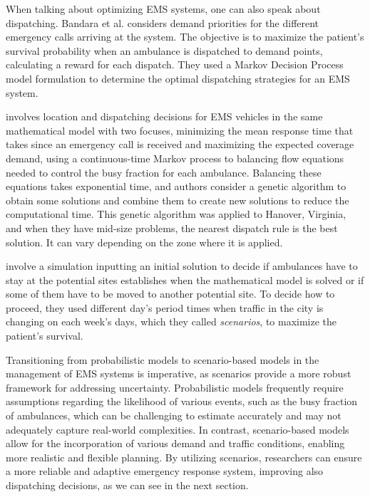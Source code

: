 When talking about optimizing EMS systems, one can also speak about dis\-pat\-ching. Bandara et al. \cite{bandara2012optimal} considers demand priorities for the different emergency calls arriving at the system. The objective is to maximize the patient's survival probability when an ambulance is dispatched to demand points, calculating a reward for each dispatch. They used a Markov Decision Process model formulation to determine the optimal dispatching strategies for an EMS system.

\citet{toro2013joint} involves location and dispatching decisions for EMS ve\-hi\-cles in the same mathematical model with two focuses, minimizing the mean response time that takes since an emergency call is received and maximizing the expected coverage demand, using a continuous-time Markov process to balancing flow e\-qua\-tions needed to control the busy fraction for each ambulance. Balancing these equations takes exponential time, and authors consider a genetic algorithm to obtain some solutions and combine them to create new solutions to reduce the computational time. This genetic algorithm was applied to Hanover, Virginia, and when they have mid-size problems, the nearest dispatch rule is the best solution. It can vary depending on the zone where it is applied.

\citet{amorim2019traffic} involve a simulation inputting an initial solution to decide if ambulances have to stay at the potential sites establishes when the mathematical model is solved or if some of them have to be moved to another potential site. To decide how to proceed, they used different day's period times when traffic in the city is changing on each week's days, which they called \textit{scenarios}, to maximize the patient's survival. 

Transitioning from probabilistic models to scenario-based models in the ma\-nage\-ment of EMS systems is imperative, as scenarios provide a more robust frame\-work for addressing uncertainty. Probabilistic models frequently require assumptions re\-gar\-ding the likelihood of various events, such as the busy fraction of ambulances, which can be challenging to estimate accurately and may not adequately capture real-world complexities. In contrast, scenario-based models allow for the in\-cor\-po\-ra\-tion of various demand and traffic conditions, enabling more realistic and flexible planning. By utilizing scenarios, researchers can ensure a more reliable and adaptive emergency response system, improving also dispatching decisions, as we can see in the next section.

